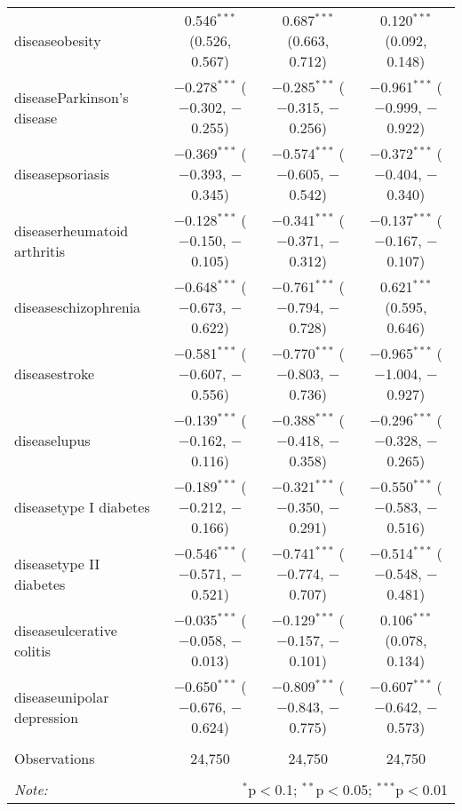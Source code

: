 \begin{table}[!htbp]
\begin{tabular}{@{\extracolsep{5pt}}lccc}
  diseaseobesity & 0.546$^{***}$ (0.526, 0.567) & 0.687$^{***}$ (0.663, 0.712) & 0.120$^{***}$ (0.092, 0.148) \\ 
  diseaseParkinson's disease & $-$0.278$^{***}$ ($-$0.302, $-$0.255) & $-$0.285$^{***}$ ($-$0.315, $-$0.256) & $-$0.961$^{***}$ ($-$0.999, $-$0.922) \\ 
  diseasepsoriasis & $-$0.369$^{***}$ ($-$0.393, $-$0.345) & $-$0.574$^{***}$ ($-$0.605, $-$0.542) & $-$0.372$^{***}$ ($-$0.404, $-$0.340) \\ 
  diseaserheumatoid arthritis & $-$0.128$^{***}$ ($-$0.150, $-$0.105) & $-$0.341$^{***}$ ($-$0.371, $-$0.312) & $-$0.137$^{***}$ ($-$0.167, $-$0.107) \\ 
  diseaseschizophrenia & $-$0.648$^{***}$ ($-$0.673, $-$0.622) & $-$0.761$^{***}$ ($-$0.794, $-$0.728) & 0.621$^{***}$ (0.595, 0.646) \\ 
  diseasestroke & $-$0.581$^{***}$ ($-$0.607, $-$0.556) & $-$0.770$^{***}$ ($-$0.803, $-$0.736) & $-$0.965$^{***}$ ($-$1.004, $-$0.927) \\ 
  diseaselupus & $-$0.139$^{***}$ ($-$0.162, $-$0.116) & $-$0.388$^{***}$ ($-$0.418, $-$0.358) & $-$0.296$^{***}$ ($-$0.328, $-$0.265) \\ 
  diseasetype I diabetes & $-$0.189$^{***}$ ($-$0.212, $-$0.166) & $-$0.321$^{***}$ ($-$0.350, $-$0.291) & $-$0.550$^{***}$ ($-$0.583, $-$0.516) \\ 
  diseasetype II diabetes & $-$0.546$^{***}$ ($-$0.571, $-$0.521) & $-$0.741$^{***}$ ($-$0.774, $-$0.707) & $-$0.514$^{***}$ ($-$0.548, $-$0.481) \\ 
  diseaseulcerative colitis & $-$0.035$^{***}$ ($-$0.058, $-$0.013) & $-$0.129$^{***}$ ($-$0.157, $-$0.101) & 0.106$^{***}$ (0.078, 0.134) \\ 
  diseaseunipolar depression & $-$0.650$^{***}$ ($-$0.676, $-$0.624) & $-$0.809$^{***}$ ($-$0.843, $-$0.775) & $-$0.607$^{***}$ ($-$0.642, $-$0.573) \\ 
 \hline \\[-1.8ex] 
Observations & 24,750 & 24,750 & 24,750 \\ 
\hline 
\hline \\[-1.8ex] 
\textit{Note:}  & \multicolumn{3}{r}{$^{*}$p$<$0.1; $^{**}$p$<$0.05; $^{***}$p$<$0.01} \\ 
\end{tabular} 
\end{table} 
